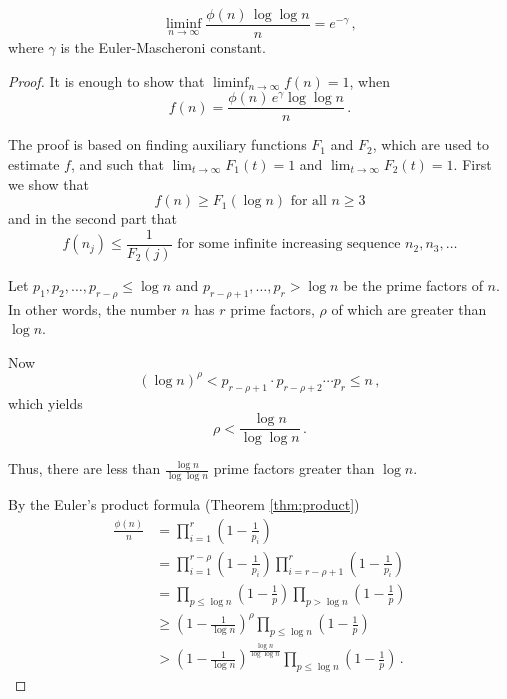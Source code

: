 \documentclass{article}
\begin{document}
\begin{theorem}
\begin{equation*}
    \liminf_{n \rightarrow \infty}{\frac{\phi(n)\,\log\log n}{n}}=e^{-\gamma}\,,
\end{equation*}
where $\gamma$ is the Euler-Mascheroni constant.

\begin{proof}

It is enough to show that $\liminf_{n\rightarrow\infty}f(n) = 1$, when
\begin{equation*}
    f(n)= \frac{\phi(n)\,e^\gamma \log\log n}{n}\,.
\end{equation*}

The proof is based on finding auxiliary functions $F_1$ and $F_2$, which are used to estimate $f$, and such that $\lim_{t\rightarrow \infty} F_1(t) = 1$ and $\lim_{t\rightarrow \infty} F_2(t) = 1$. First we show that 
\begin{equation}
\label{eq:first}
    f(n) \geq F_1(\log n)\text{ for all }n\geq 3
\end{equation}
and in the second part that
\begin{equation}
\label{eq:second}
    f(n_j) \leq \frac{1}{F_2(j)}\text{ for some infinite increasing sequence }n_2, n_3,\dots
\end{equation}

Let $p_1,p_2,\dots,p_{r-\rho} \leq \log n$ and $p_{r-\rho+1},\dots,p_r > \log n$ be the prime factors of $n$. In other words, the number $n$ has $r$ prime factors, $\rho$ of which are greater than $\log n$.

Now
\begin{equation*}
    (\log n)^\rho < p_{r-\rho+1} \cdot p_{r-\rho+2} \cdots p_r \leq n\,,
\end{equation*}
which yields
\begin{equation*}
    \rho < \frac{\log n}{\log\log n}\,.
\end{equation*}

Thus, there are less than $\frac{\log n}{\log\log n}$ prime factors greater than $\log n$.

By the Euler's product formula (Theorem \ref{thm:product})
\begin{align*}
    \frac{\phi(n)}{n} & = \prod_{i=1}^r\left(1-\frac{1}{p_i}\right)\\
    & = \prod_{i=1}^{r-\rho}\left(1-\frac{1}{p_i}\right) \prod_{i=r-\rho+1}^r\left(1-\frac{1}{p_i}\right)\\
    & = \prod_{p\leq\log n}\left(1-\frac{1}{p}\right) \prod_{p>\log n}\left(1-\frac{1}{p}\right)\\
    & \geq \left(1-\frac{1}{\log n}\right)^\rho \prod_{p\leq\log n}\left(1-\frac{1}{p}\right) \\
    & > \left(1-\frac{1}{\log n}\right)^\frac{\log n}{\log \log n} \prod_{p\leq\log n}\left(1-\frac{1}{p}\right)\,.
\end{align*}


\end{proof}
\end{theorem}
\end{document}
